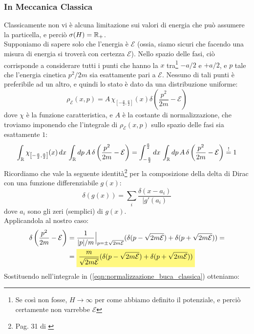 \documentclass[../../FisicaTeorica.tex]{subfiles}
\begin{document}
\subsubsection{In Meccanica Classica}
Classicamente non vi è alcuna limitazione sui valori di energia che può assumere la particella, e perciò 
$\sigma(H) = \mathbb{R}_+$.\\
Supponiamo di sapere solo che l'energia è $\mathcal{E}$ (ossia, siamo sicuri che facendo una misura di energia si troverà con certezza $\mathcal{E}$). Nello spazio delle fasi, ciò corrisponde a considerare tutti i punti che hanno la $x$ tra\footnote{Se così non fosse, $H\to\infty$ per come abbiamo definito il potenziale, e perciò certamente non varrebbe $\mathcal{E}$} $-a/2$ e $+a/2$, e $p$ tale che l'energia cinetica $p^2/2m$ sia esattamente pari a $\mathcal{E}$. Nessuno di tali punti è preferibile ad un altro, e quindi lo stato è dato da una distribuzione uniforme:
\begin{equation}
\rho_\mathcal{E}(x,p)=A\,\chi_{\left[-\frac{a}{2},\frac{a}{2}\right]}(x)\delta\left(\frac{p^2}{2m}-\mathcal{E}\right)
\label{eqn:stato_classico}
\end{equation}
dove $\chi$ è la funzione caratteristica, e $A$ è la costante di normalizzazione, che troviamo imponendo che l'integrale di $\rho_\mathcal{E}(x,p)$ sullo spazio delle fasi sia esattamente $1$:
\begin{equation}
\int_{\mathbb{R}} \chi_{\left[-\frac{a}{2},\frac{a}{2}\right]}(x)\,dx\, \int_{\mathbb{R}} dp\,A\,\delta\left(\frac{p^2}{2m}-\mathcal{E}\right) =
\int_{-\frac{a}{2}}^{\frac{a}{2}} dx\,\int_{\mathbb{R}} dp\, A\,\delta\left(\frac{p^2}{2m}-\mathcal{E}\right) \overset{!}{=} 1
\label{eqn:normalizzazione_buca_classica}
\end{equation}
Ricordiamo che vale la seguente identità\footnote{Pag. 31 di \cite{spazi_hilbert}} per la composizione della delta di Dirac con una funzione differenziabile $g(x)$:
\[
\delta(g(x))=\sum_{i}\frac{\delta(x-a_i)}{|g'(a_i)}
\]
dove $a_i$ sono gli zeri (semplici) di $g(x)$.\\
Applicandola al nostro caso:
\begin{align*}
\delta\left(\frac{p^2}{2m}-\mathcal{E}\right) &=\frac{1}{|p|/m}\Big|_{p=\pm \sqrt{2m\mathcal{E}}} (\delta(p-\sqrt{2m\mathcal{E}})+\delta(p+\sqrt{2m\mathcal{E}}))
= \\
&=\hlc{Yellow}{\frac{m}{\sqrt{2m\mathcal{E}}}(\delta(p-\sqrt{2m\mathcal{E}})+\delta(p+\sqrt{2m\mathcal{E}}))}
\end{align*}
Sostituendo nell'integrale in (\ref{eqn:normalizzazione_buca_classica}) otteniamo:
\end{document}
